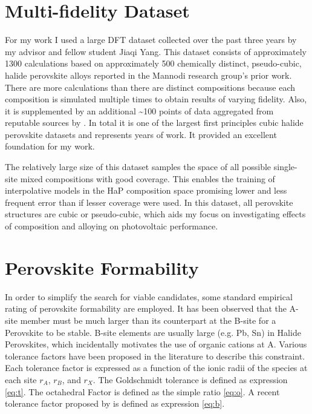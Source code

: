 \section{Multi-fidelity Dataset}
\label{sec:orgc33343b}
For my work I used a large DFT dataset collected over the past three years by my advisor and fellow student Jiaqi Yang.
This dataset consists of approximately 1300 calculations based on approximately 500 chemically distinct, pseudo-cubic, halide perovskite alloys reported in the Mannodi research group's prior work.
\autocite{mannodi-kanakkithodi-2022-data-driven,yang-2023-high-throug}
There are more calculations than there are distinct compositions because each composition is simulated multiple times to obtain results of varying fidelity.
Also, it is supplemented by an additional \textasciitilde{}100 points of data aggregated from reputable sources by \textcite{almora-2020-devic-perfor}.
In total it is one of the largest first principles cubic halide perovskite datasets and represents years of work.
It provided an excellent foundation for my work.

The relatively large size of this dataset samples the space of all possible single-site mixed compositions with good coverage.
This enables the training of interpolative models in the HaP composition space promising lower and less frequent error than if lesser coverage were used.
In this dataset, all perovskite structures are cubic or pseudo-cubic, which aids my focus on investigating effects of composition and alloying on photovoltaic performance.

\section{Perovskite Formability}
\label{sec:org0cdae8d}
In order to simplify the search for viable candidates, some standard empirical rating of perovskite formability are employed.
It has been observed that the A-site member must be much larger than its counterpart at the B-site for a Perovskite to be stable.
B-site elements are usually large (e.g. Pb, Sn) in Halide Perovskites, which incidentally motivates the use of organic cations at A.
\autocite{kieslich-2015-exten-toler}
Various tolerance factors have been proposed in the literature to describe this constraint.
Each tolerance factor is expressed as a function of the ionic radii of the species at each site \(r_A\), \(r_B\), and \(r_X\).
The Goldschmidt tolerance is defined as expression \ref{eq:t}.
\autocite{yin-2015-halid-perov}
The octahedral Factor is defined as the simple ratio \ref{eq:o}.
A recent tolerance factor proposed by \textcite{bartel-2019-new-toler} is defined as expression \ref{eq:b}.

